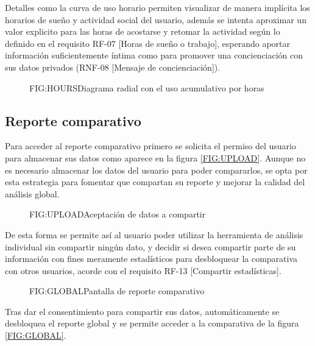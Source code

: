 Detalles como la curva de uso horario permiten visualizar de manera implícita los horarios de sueño y actividad social del usuario, además se intenta aproximar un valor explicito para las horas de acostarse y retomar la actividad según lo definido en el requisito RF-07 [Horas de sueño o trabajo], esperando aportar información suficientemente íntima como para promover una concienciación con sus datos privados (RNF-08 [Mensaje de concienciación]).

\begin{figure}[Reporte de uso acumulativo por horas]{FIG:HOURS}{Diagrama radial con el uso acumulativo por horas}
\end{figure}

\subsection{Reporte comparativo}

Para acceder al reporte comparativo primero se solicita el permiso del usuario para almacenar sus datos como aparece en la figura \ref{FIG:UPLOAD}. Aunque no es necesario almacenar los datos del usuario para poder compararlos, se opta por esta estrategia para fomentar que compartan su reporte y mejorar la calidad del análisis global.

\begin{figure}[Pantalla de consentimiento de datos]{FIG:UPLOAD}{Aceptación de datos a compartir}
\end{figure}

De esta forma se permite así al usuario poder utilizar la herramienta de análisis individual sin compartir ningún dato, y decidir si desea compartir parte de su información con fines meramente estadísticos para desbloquear la comparativa con otros usuarios, acorde con el requisito RF-13 [Compartir estadísticas].

\begin{figure}[Pantalla de métricas comparativas]{FIG:GLOBAL}{Pantalla de reporte comparativo}
\end{figure}

Tras dar el consentimiento para compartir sus datos, automáticamente se desbloquea el reporte global y se permite acceder a la comparativa de la figura \ref{FIG:GLOBAL}.

\newpage
